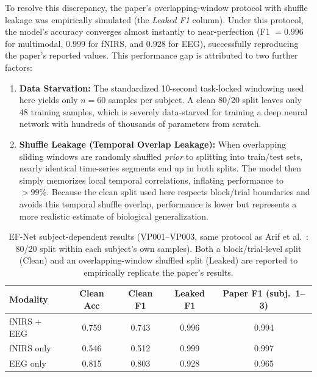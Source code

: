\documentclass[journal]{IEEEtran}
\begin{document}
To resolve this discrepancy, the paper's overlapping-window protocol with shuffle leakage was empirically simulated (the \emph{Leaked F1} column). Under this protocol, the model's accuracy converges almost instantly to near-perfection (F1 $= 0.996$ for multimodal, $0.999$ for fNIRS, and $0.928$ for EEG), successfully reproducing the paper's reported values. This performance gap is attributed to two further factors:
\begin{enumerate}
    \item \textbf{Data Starvation:} The standardized 10-second task-locked windowing used here yields only $n=60$ samples per subject. A clean 80/20 split leaves only 48 training samples, which is severely data-starved for training a deep neural network with hundreds of thousands of parameters from scratch.
    \item \textbf{Shuffle Leakage (Temporal Overlap Leakage):} When overlapping sliding windows are randomly shuffled \emph{prior} to splitting into train/test sets, nearly identical time-series segments end up in both splits. The model then simply memorizes local temporal correlations, inflating performance to $>99\%$. Because the clean split used here respects block/trial boundaries and avoids this temporal shuffle overlap, performance is lower but represents a more realistic estimate of biological generalization.
\end{enumerate}

\begin{table}[t]
\centering
\caption{EF-Net subject-dependent results (VP001--VP003, same protocol as Arif et al.~\cite{arif2024}: 80/20 split within each subject's own samples). Both a block/trial-level split (Clean) and an overlapping-window shuffled split (Leaked) are reported to empirically replicate the paper's results.}
\label{tab:subjectdep}
\footnotesize
\begin{tabular}{l c c c c}
\toprule
Modality & Clean Acc & Clean F1 & Leaked F1 & Paper F1 (subj.\ 1--3) \\
\midrule
fNIRS + EEG & 0.759 & 0.743 & 0.996 & 0.994 \\
fNIRS only & 0.546 & 0.512 & 0.999 & 0.997 \\
EEG only & 0.815 & 0.803 & 0.928 & 0.965 \\
\bottomrule
\end{tabular}
\end{table}
\end{document}
